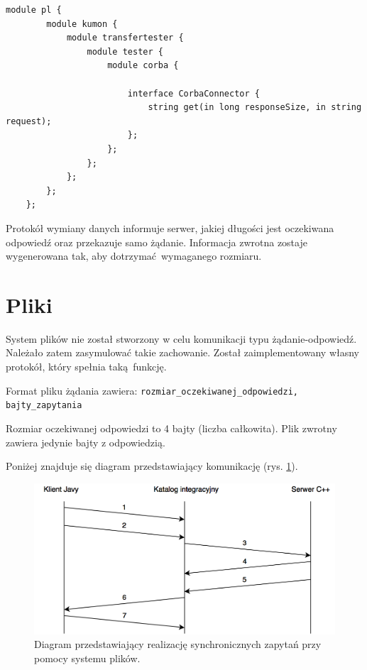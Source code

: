 \begin{lstlisting}[caption={Zastosowany interfejs (IDL).},captionpos=b]
    module pl {
        module kumon {
            module transfertester {
                module tester {
                    module corba {

                        interface CorbaConnector {
                            string get(in long responseSize, in string request);
                        };
                    };
                };
            };
        };
    };
\end{lstlisting}

Protokół wymiany danych informuje serwer, jakiej długości jest oczekiwana odpowiedź oraz przekazuje samo żądanie. Informacja zwrotna zostaje wygenerowana tak, aby dotrzymać wymaganego rozmiaru.


\section{Pliki}

System plików nie został stworzony w celu komunikacji typu żądanie-odpowiedź. Należało zatem zasymulować takie zachowanie. Został zaimplementowany własny protokół, który spełnia taką funkcję.

Format pliku żądania zawiera:
\newline
\texttt{rozmiar\_oczekiwanej\_odpowiedzi, bajty\_zapytania}

Rozmiar oczekiwanej odpowiedzi to 4 bajty (liczba całkowita). Plik zwrotny zawiera jedynie bajty z odpowiedzią.

Poniżej znajduje się diagram przedstawiający komunikację (rys. \ref{fig:filesystem_sync}).

\begin{figure}[h!]
    \centering
    \includegraphics[width=\textwidth,height=\textheight,keepaspectratio]{img/files_impl_diagram.png}
    \caption{Diagram przedstawiający realizację synchronicznych zapytań przy pomocy systemu plików.}
    \label{fig:filesystem_sync}
\end{figure}

